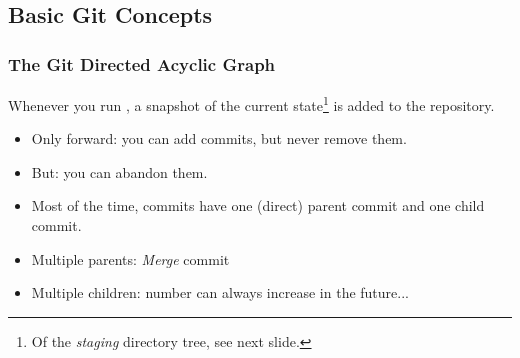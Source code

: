 \subsection{Basic Git Concepts}


\begin{frame}
  \frametitle{The Git Directed Acyclic Graph}

  Whenever you run , a snapshot of the current
  state\footnote{Of the \emph{staging} directory tree, see next
    slide.} is added to the repository.
  \begin{itemize}
  \item<2-> Only forward: you can add commits, but never remove them.
  \item<3-> But: you can abandon them.
  \item<4-> Most of the time, commits have one (direct) parent commit and
    one child commit.
  \item<5-> Multiple parents: \emph{Merge} commit
  \item<6-> Multiple children: number can always increase in the future...
  \end{itemize}
\end{frame}


{
  \begin{frame}[plain]
  \end{frame}
}


